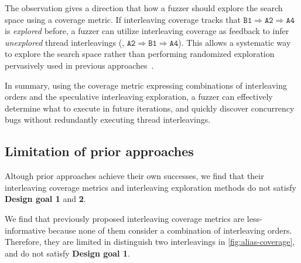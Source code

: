 %
The observation gives a direction that how a fuzzer should explore 
the search space using a coverage metric.
If interleaving coverage tracks that
$\texttt{B1} \Rightarrow \texttt{A2} \Rightarrow \texttt{A4}$ is
\textit{explored} before, a fuzzer can utilize interleaving
coverage as feedback to infer \textit{unexplored} thread interleavings (\eg,
$\texttt{A2} \Rightarrow \texttt{B1} \Rightarrow \texttt{A4}$).
%
This allows a systematic way to explore the search space rather than
performing randomized exploration pervasively used in previous
approaches~\cite{ski, krace, pctalgorithm, muzz}.
%

In summary, using the coverage metric expressing combinations of
interleaving orders and the speculative interleaving exploration, a
fuzzer can effectively determine what to execute in future iterations,
and quickly discover concurrency bugs without redundantly executing
thread interleavings.


\subsection{Limitation of prior approaches}
\label{ss:existingapproaches}
%
%   

%
Altough prior approaches achieve their own successes, we find that
their interleaving coverage metrics and interleaving exploration
methods do not satisfy \textbf{Design goal 1} and \textbf{2}.


%
We find that previously proposed interleaving coverage metrics are
less-informative because none of them consider a combination of
interleaving orders. Therefore, they are limited in distinguish two
interleavings in \autoref{fig:alias-coverage}, and do not satisfy
\textbf{Design goal 1}.


